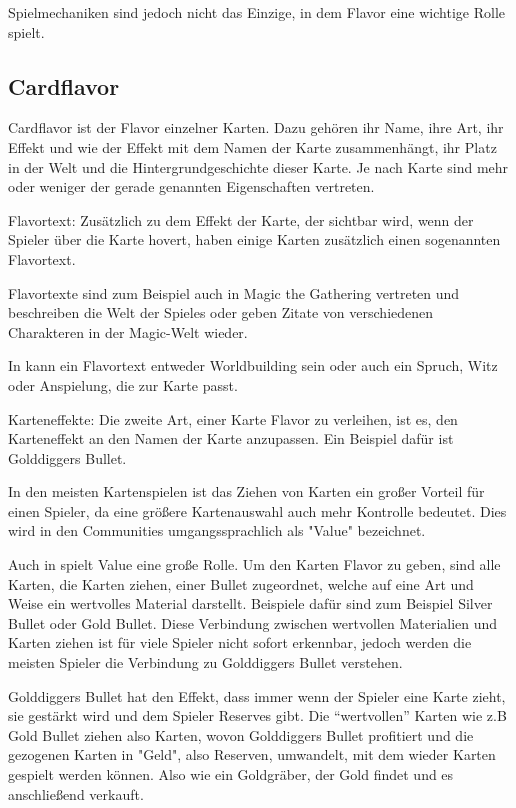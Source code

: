 Spielmechaniken sind jedoch nicht das Einzige, in dem Flavor eine wichtige Rolle spielt.

\subsection{Cardflavor}\label{subsec:cardflavor}

Cardflavor ist der Flavor einzelner Karten.
Dazu gehören ihr Name, ihre Art, ihr Effekt und wie der Effekt mit dem Namen der Karte zusammenhängt,
ihr Platz in der Welt und die Hintergrundgeschichte dieser Karte. Je nach Karte sind mehr oder weniger der gerade genannten
Eigenschaften vertreten.


Flavortext:
Zusätzlich zu dem Effekt der Karte, der sichtbar wird, wenn der Spieler über die Karte hovert, haben einige Karten zusätzlich einen sogenannten Flavortext.


Flavortexte sind zum Beispiel auch in Magic the Gathering vertreten und beschreiben die Welt der Spieles oder geben
Zitate von verschiedenen Charakteren in der Magic-Welt wieder.\cite{magicarena,soulOfTheGame} %


In \FF kann ein Flavortext entweder Worldbuilding sein oder auch ein Spruch, Witz oder Anspielung, die zur Karte passt.


Karteneffekte:
Die zweite Art, einer Karte Flavor zu verleihen, ist es, den Karteneffekt an den Namen der Karte anzupassen.
Ein Beispiel dafür ist Golddiggers Bullet.


In den meisten Kartenspielen ist das Ziehen von Karten ein großer Vorteil für einen Spieler, da eine größere Kartenauswahl
auch mehr Kontrolle bedeutet. Dies wird in den Communities umgangssprachlich als "Value" bezeichnet. \cite{whatsvalue}


Auch in \FF spielt Value eine große Rolle.
Um den Karten Flavor zu geben, sind alle Karten, die Karten ziehen, einer Bullet zugeordnet, welche auf eine Art und Weise ein wertvolles Material darstellt.
Beispiele dafür sind zum Beispiel Silver Bullet oder Gold Bullet. Diese Verbindung zwischen wertvollen
Materialien und Karten ziehen ist für viele Spieler nicht sofort erkennbar, jedoch werden die meisten Spieler die Verbindung zu Golddiggers Bullet verstehen.


Golddiggers Bullet hat den Effekt, dass immer wenn der Spieler eine Karte zieht, sie gestärkt wird und dem Spieler Reserves gibt. Die “wertvollen” Karten wie z.B Gold Bullet ziehen also Karten, wovon Golddiggers Bullet profitiert und die
gezogenen Karten in "Geld", also Reserven, umwandelt, mit dem wieder Karten gespielt werden können. Also wie ein Goldgräber, der Gold findet und es anschließend verkauft.

